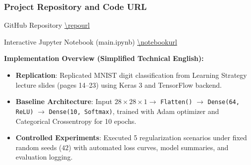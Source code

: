 {
\usebackgroundtemplate{\backgroundcontent}
\begin{frame}
    \frametitle{Project Repository and Code URL}
    \vspace{0.15cm}
    \begin{block}{GitHub Repository}
        \footnotesize\url{\repourl}
    \end{block}
    
    \vspace{0.15cm}
    \begin{block}{Interactive Jupyter Notebook (main.ipynb)}
        \footnotesize\url{\notebookurl}
    \end{block}
    
    \vspace{0.25cm}
    \textbf{\footnotesize Implementation Overview (Simplified Technical English):}
    \vspace{0.10cm}
    \begin{itemize}\footnotesize
        \setlength\itemsep{3pt}
        \item \textbf{Replication}: Replicated MNIST digit classification from Learning Strategy lecture slides (pages 14--23) using Keras 3 and TensorFlow backend.
        \item \textbf{Baseline Architecture}: Input $28 \times 28 \times 1 \to$ \texttt{Flatten()} $\to$ \texttt{Dense(64, ReLU)} $\to$ \texttt{Dense(10, Softmax)}, trained with Adam optimizer and Categorical Crossentropy for 10 epochs.
        \item \textbf{Controlled Experiments}: Executed 5 regularization scenarios under fixed random seeds ($42$) with automated loss curves, model summaries, and evaluation logging.
    \end{itemize}
\end{frame}
}

